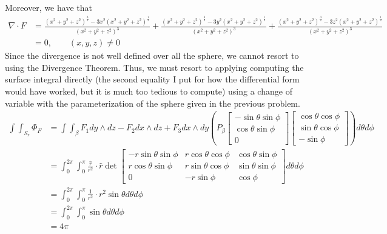 \documentclass[11pt]{article}
\begin{document}
\begin{itemize}
\begin{solution}
    Moreover, we have that 
    \begin{align*}
    \nabla \cdot F &= \frac{(x^2 + y^2 + z^2)^{\frac{3}{2}} - 3x^2(x^2+ y^2 + z^2)^\frac{1}{2}}{(x^2 + y^2 + z^2)^3} + \frac{(x^2 + y^2 + z^2)^{\frac{3}{2}} - 3y^2(x^2+ y^2 + z^2)^\frac{1}{2}}{(x^2 + y^2 + z^2)^3} + \frac{(x^2 + y^2 + z^2)^{\frac{3}{2}} - 3z^2(x^2+ y^2 + z^2)^\frac{1}{2}}{(x^2 + y^2 + z^2)^3}\\
    &= 0, \qquad (x,y,z)\neq 0
   \end{align*} Since the divergence is not well defined over all the sphere, we cannot resort to using the Divergence Theorem. Thus, we must resort to applying computing the surface integral directly (the second equality I put for how the differential form would have worked, but it is much too tedious to compute) using a change of variable with the parameterization of the sphere given in the previous problem.
   \begin{align*}
       \int\int_{S_r}\Phi_F &=\int \int_{\beta} F_1 dy \wedge dz - F_2 dx\wedge dz + F_3dx \wedge dy \left(P_{\beta} \begin{bmatrix}
            -\sin\theta\sin\phi\\
            \cos\theta\sin\phi\\
            0
        \end{bmatrix}\begin{bmatrix}
            \cos\theta\cos\phi\\
            \sin\theta\cos\phi\\
            -\sin\phi
        \end{bmatrix}\right) d\theta d\phi\\
       &= \int_0^{2\pi}\int_0^\pi \frac{\hat{r}}{r^2}\cdot \hat{r}\det \begin{bmatrix}
        -r\sin\theta\sin\phi & r\cos\theta\cos\phi &\cos\theta \sin\phi\\
        r\cos\theta\sin\phi & r\sin\theta\cos\phi &\sin\theta \sin\phi\\
        0 & -r\sin\phi & \cos\phi
    \end{bmatrix}d\theta d\phi \\
    &= \int_0^{2\pi}\int_0^\pi  \frac{1}{r^2}\cdot r^2\sin\theta d\theta d\phi\\
    &= \int_0^{2\pi}\int_0^\pi  \sin\theta d\theta d\phi \\
    &= 4\pi 
   \end{align*}
   

\end{solution}
\end{itemize}
\end{document}

